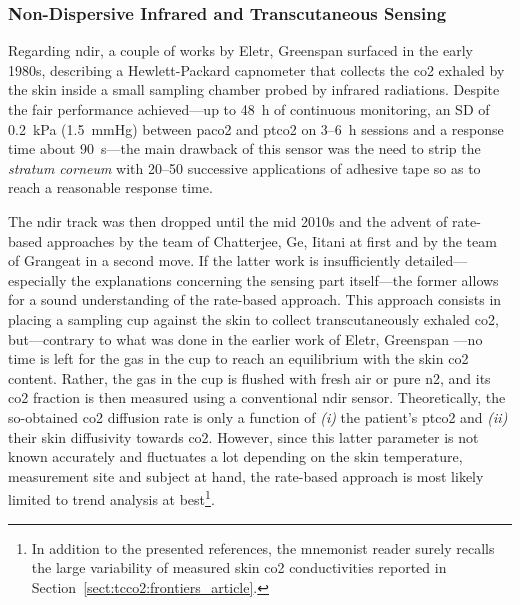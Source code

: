 \subsubsection{Non-Dispersive Infrared and Transcutaneous Sensing}

Regarding \gls{ndir}, a couple of works by Eletr, Greenspan \etal{} surfaced in the early 1980s\cite{eletr1978, greenspan1981}, describing a Hewlett-Packard capnometer that collects the \gls{co2} exhaled by the skin inside a small sampling chamber probed by infrared radiations. Despite the fair performance achieved---up to 48~h of continuous monitoring, an SD of 0.2~kPa (1.5~mmHg) between \gls{paco2} and \gls{ptco2} on 3--6~h sessions and a response time about 90~s\cite{eletr1978}---the main drawback of this sensor was the need to strip the \textit{stratum corneum} with 20--50 successive applications of adhesive tape so as to reach a reasonable response time.

The \gls{ndir} track was then dropped until the mid 2010s and the advent of rate-based approaches by the team of Chatterjee, Ge, Iitani \etal{}\cite{chatterjee2014, chatterjee2015, ge2018, iitani2021} at first and by the team of Grangeat \etal{}\cite{grangeat2019, grangeat2020} in a second move. If the latter work is insufficiently detailed---especially the explanations concerning the sensing part itself---the former allows for a sound understanding of the rate-based approach. This approach consists in placing a sampling cup against the skin to collect transcutaneously exhaled \gls{co2}, but---contrary to what was done in the earlier work of Eletr, Greenspan \etal{}---no time is left for the gas in the cup to reach an equilibrium with the skin \gls{co2} content. Rather, the gas in the cup is flushed with fresh air or pure \gls{n2}, and its \gls{co2} fraction is then measured using a conventional \gls{ndir} sensor. Theoretically, the so-obtained \gls{co2} diffusion rate is only a function of \emph{(i)} the patient's \gls{ptco2} and \emph{(ii)} their skin diffusivity towards \gls{co2}\cite{chatterjee2015}. However, since this latter parameter is not known accurately and fluctuates a lot depending on the skin temperature\cite{shaw1930, scheuplein1976}, measurement site\cite{adamczyk1966, levshankov1983} and subject at hand\cite{ernstene1932a}, the rate-based approach is most likely limited to trend analysis at best\footnote{In addition to the presented references, the mnemonist reader surely recalls the large variability of measured skin \gls{co2} conductivities reported in Section~\ref{sect:tcco2:frontiers_article}.}.

